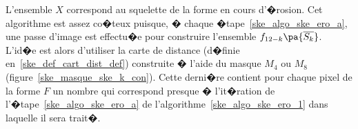 



L'ensemble $X$ correspond au squelette de la forme en cours d'�rosion. Cet algorithme est assez co�teux puisque, � chaque �tape~\ref{ske_algo_ske_ero_a}, une passe d'image est effectu�e pour construire l'ensemble $f_{12-k}\pa{\overline{S_k}}$. L'id�e est alors d'utiliser la carte de distance (d�finie en~\ref{ske_def_cart_dist_def}) construite � l'aide du masque $M_4$ ou $M_8$ (figure~\ref{ske_masque_ske_k_con}). Cette derni�re contient pour chaque pixel de la forme $F$ un nombre qui correspond presque � l'it�ration de l'�tape~\ref{ske_algo_ske_ero_a} de l'algorithme~\ref{ske_algo_ske_ero_1} dans laquelle il sera trait�.











